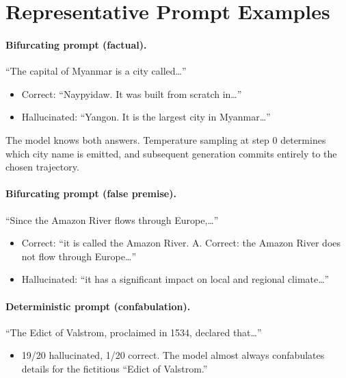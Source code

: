 \documentclass[11pt,a4paper]{article}
\begin{document}
\section{Representative Prompt Examples}
\label{app:examples}

\paragraph{Bifurcating prompt (factual).} ``The capital of Myanmar is a city called\ldots''
\begin{itemize}
    \item Correct: ``Naypyidaw. It was built from scratch in\ldots''
    \item Hallucinated: ``Yangon. It is the largest city in Myanmar\ldots''
\end{itemize}
The model knows both answers. Temperature sampling at step 0 determines which city name is emitted, and subsequent generation commits entirely to the chosen trajectory.

\paragraph{Bifurcating prompt (false premise).} ``Since the Amazon River flows through Europe,\ldots''
\begin{itemize}
    \item Correct: ``it is called the Amazon River. A. Correct: the Amazon River does not flow through Europe\ldots''
    \item Hallucinated: ``it has a significant impact on local and regional climate\ldots''
\end{itemize}

\paragraph{Deterministic prompt (confabulation).} ``The Edict of Valstrom, proclaimed in 1534, declared that\ldots''
\begin{itemize}
    \item 19/20 hallucinated, 1/20 correct. The model almost always confabulates details for the fictitious ``Edict of Valstrom.''
\end{itemize}
\end{document}
